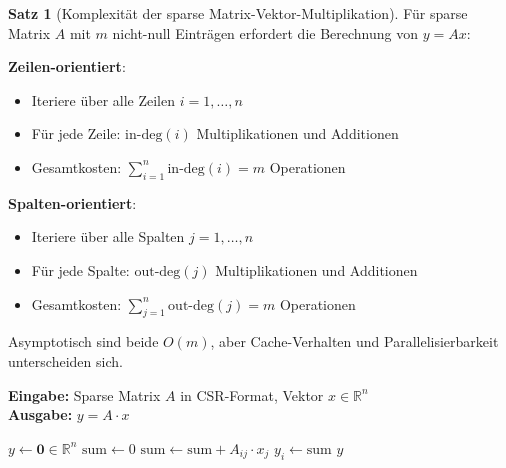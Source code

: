 \documentclass[a4paper,12pt]{report}
\theoremstyle{definition}
\newtheorem{satz}{Satz}
\begin{document}
	\begin{satz}[Komplexität der sparse Matrix-Vektor-Multiplikation]
		Für sparse Matrix $A$ mit $m$ nicht-null Einträgen erfordert die Berechnung von $y = Ax$:
		
		\textbf{Zeilen-orientiert}:
		\begin{itemize}
			\item Iteriere über alle Zeilen $i = 1,\ldots,n$
			\item Für jede Zeile: $\text{in-deg}(i)$ Multiplikationen und Additionen
			\item Gesamtkosten: $\sum_{i=1}^n \text{in-deg}(i) = m$ Operationen
		\end{itemize}
		
		\textbf{Spalten-orientiert}:
		\begin{itemize}
			\item Iteriere über alle Spalten $j = 1,\ldots,n$
			\item Für jede Spalte: $\text{out-deg}(j)$ Multiplikationen und Additionen
			\item Gesamtkosten: $\sum_{j=1}^n \text{out-deg}(j) = m$ Operationen
		\end{itemize}
		
		Asymptotisch sind beide $O(m)$, aber Cache-Verhalten und Parallelisierbarkeit unterscheiden sich.
	\end{satz}
	
	\begin{algorithm}[H]
		\caption{Zeilen-orientierte sparse Matrix-Vektor-Multiplikation}
		\label{alg:row-matvec}
		\textbf{Eingabe:} Sparse Matrix $A$ in CSR-Format, Vektor $x \in \mathbb{R}^n$ \\
		\textbf{Ausgabe:} $y = A \cdot x$
		\begin{algorithmic}[1]
			\State $y \gets \mathbf{0} \in \mathbb{R}^n$
			\State $\text{sum} \gets 0$
			\State $\text{sum} \gets \text{sum} + A_{ij} \cdot x_j$
			\EndFor
			\State $y_i \gets \text{sum}$
			\EndFor
			\State \Return $y$
		\end{algorithmic}
	\end{algorithm}
\end{document}
